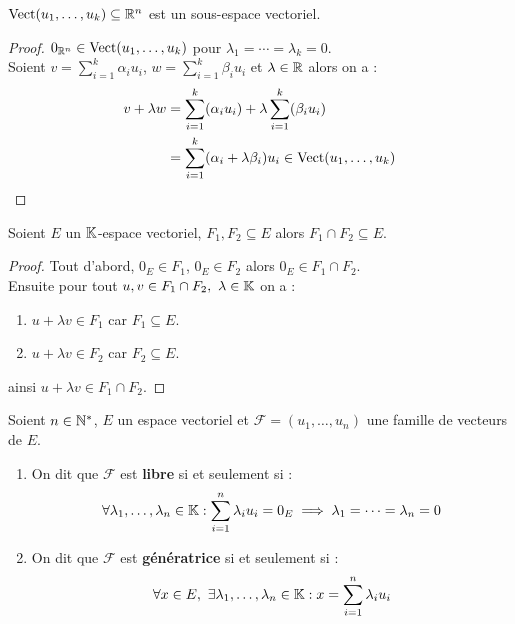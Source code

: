 \begin{proposition}
	$\operatorname{Vect}(u_1, \ldots, u_k) \subseteq \mathbb{R}^n$ est un sous-espace vectoriel.
\end{proposition}

\begin{proof}
	$0_{\mathbb{R}^n} \in \operatorname{Vect}(u_1, \ldots, u_k)$ pour $\lambda_1 = \cdots = \lambda_k = 0$.
	\\
	Soient $v = \sum_{i=1}^{k} \alpha_i u_i$, $w = \sum_{i=1}^{k} \beta_i u_i$ et $\lambda \in \mathbb{R}$ alors on a :
	\begin{align*}
		v + \lambda w &= \sum_{i=1}^{k} (\alpha_i u_i) + \lambda \sum_{i=1}^{k} (\beta_i u_i) \\
		&= \sum_{i=1}^{k} (\alpha_i + \lambda \beta_i) u_i \in \operatorname{Vect}(u_1, \ldots, u_k)
	\end{align*}
\end{proof}

\begin{proposition}
	Soient $E$ un $\mathbb{K}$-espace vectoriel, $F_1, F_2 \subseteq E$ alors $F_1 \cap F_2 \subseteq E$.
\end{proposition}

\begin{proof}
	Tout d'abord, $0_E \in F_1$, $0_E \in F_2$ alors $0_E \in F_1 \cap F_2$.
	\\
	Ensuite pour tout $u, v \in F_1 \cap F_2,\ \lambda \in \K$ on a :
	\begin{enumerate}
		\item $u + \lambda v \in F_1$ car $F_1 \subseteq E$. 
		\item $u + \lambda v \in F_2$ car $F_2 \subseteq E$.
	\end{enumerate}
	ainsi $u + \lambda v \in F_1 \cap F_2$.
\end{proof}

\begin{definition}
	Soient $n \in \mathbb{N}^*$, $E$ un espace vectoriel et $\mathcal{F} = (u_1, \ldots, u_n)$ une famille de vecteurs de $E$.
	\begin{enumerate}
		\item On dit que $\mathcal{F}$ est \textbf{libre} si et seulement si :
		\begin{align*}
			\forall \lambda_1, \ldots, \lambda_n \in \mathbb{K} : \sum_{i = 1}^n \lambda_i u_i = 0_E \implies \lambda_1 = \cdots = \lambda_n = 0
		\end{align*}
		\item On dit que $\mathcal{F}$ est \textbf{génératrice} si et seulement si :
		\begin{align*}
			\forall x \in E,\ \exists \lambda_1, \ldots, \lambda_n \in \mathbb{K} : x = \sum_{i = 1}^n \lambda_i u_i 
		\end{align*}
	\end{enumerate}
\end{definition}

